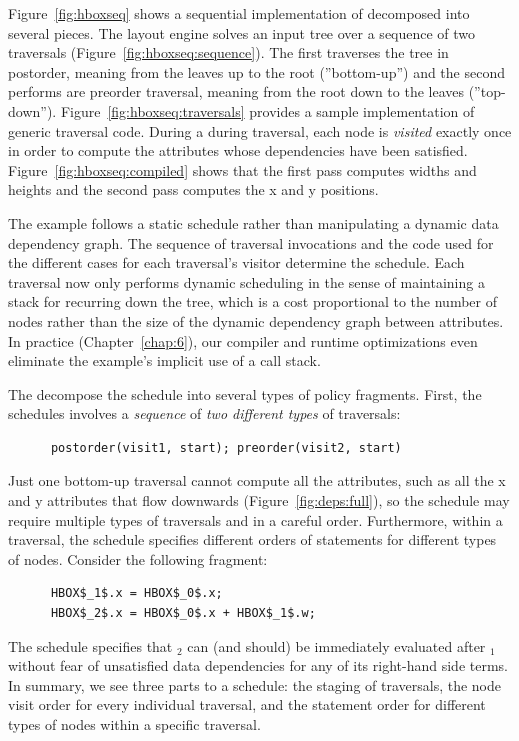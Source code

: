 Figure~\ref{fig:hboxseq} shows a sequential implementation of \hlang decomposed into several pieces. The layout engine solves an input tree over a sequence of two traversals (Figure~\ref{fig:hboxseq:sequence}). The first traverses the tree in postorder, meaning from the leaves up to the root (''bottom-up'') and the second performs are preorder traversal, meaning from the root down to the leaves (''top-down''). Figure~\ref{fig:hboxseq:traversals} provides a sample implementation of generic traversal code. During a during traversal, each node is \emph{visited} exactly once in order to compute the attributes whose dependencies have been satisfied. Figure~\ref{fig:hboxseq:compiled} shows that the first pass computes widths and heights and the second pass computes the x and y positions.

The example follows a static schedule rather than manipulating a dynamic data dependency graph. The sequence of traversal invocations and the code used for the different cases for each traversal's visitor determine the schedule. Each traversal now only performs dynamic scheduling in the sense of maintaining a stack for recurring down the tree, which is a cost proportional to the number of nodes rather than the size of the dynamic dependency graph between attributes. In practice (Chapter~\ref{chap:6}), our compiler and runtime optimizations even eliminate the example's implicit use of a call stack.


The decompose the schedule into several types of policy fragments. First, the schedules involves a \emph{sequence} of  \emph{two different types} of traversals:
\begin{lstlisting}
      postorder(visit1, start); preorder(visit2, start)
\end{lstlisting}
Just one bottom-up traversal cannot compute all the attributes, such as all the x and y attributes that flow downwards (Figure~\ref{fig:deps:full}), so the schedule may require multiple types of traversals and in a careful order.  Furthermore, within a traversal, the schedule specifies different orders of statements for different types of nodes. Consider the following fragment:
\begin{lstlisting}
      HBOX$_1$.x = HBOX$_0$.x;
      HBOX$_2$.x = HBOX$_0$.x + HBOX$_1$.w;
\end{lstlisting}
The schedule specifies that $_2$ can (and should) be immediately evaluated after $_1$ without fear of unsatisfied data dependencies for any of its right-hand side terms. In summary, we see three parts to a schedule: the staging of traversals, the node visit order for every individual traversal, and the statement order for different types of nodes within a specific traversal.

